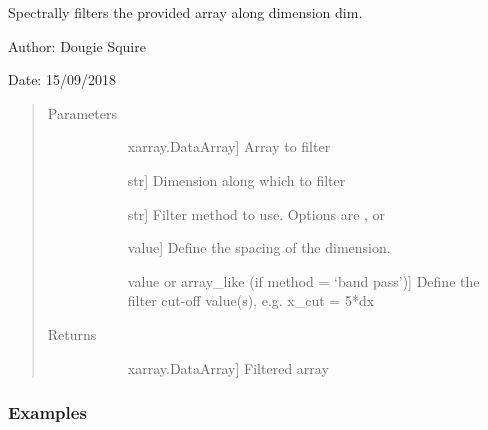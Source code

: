 \documentclass[letterpaper,10pt,english]{sphinxmanual}
\begin{document}
\begin{fulllineitems}
\label{\detokenize{utils_doc:utils.fftfilt}}
Spectrally filters the provided array along dimension dim.

\begin{DUlineblock}{0em}
\item[] Author: Dougie Squire
\item[] Date: 15/09/2018
\end{DUlineblock}
\begin{quote}\begin{description}
\item[{Parameters}] \leavevmode\begin{description}
\item[{}] \leavevmode{[}xarray.DataArray{]}
Array to filter

\item[{}] \leavevmode{[}str{]}
Dimension along which to filter

\item[{}] \leavevmode{[}str{]}
Filter method to use. Options are ,  or 

\item[{}] \leavevmode{[}value{]}
Define the spacing of the dimension.

\item[{}] \leavevmode{[}value or array\_like (if method = ‘band pass’){]}
Define the filter cut-off value(s), e.g. x\_cut = 5*dx

\end{description}

\item[{Returns}] \leavevmode\begin{description}
\item[{}] \leavevmode{[}xarray.DataArray{]}
Filtered array

\end{description}

\end{description}\end{quote}
\subsubsection*{Examples}


\end{fulllineitems}
\end{document}
